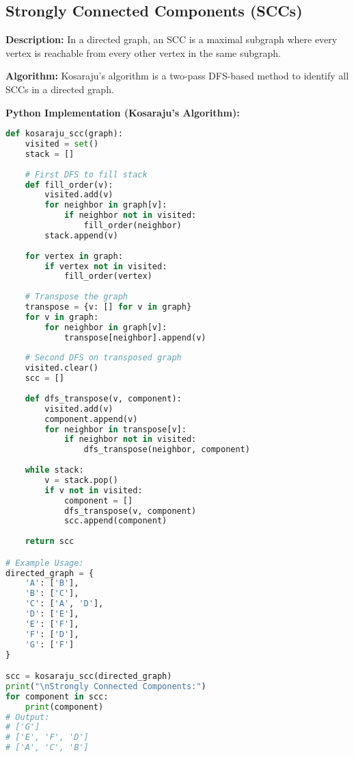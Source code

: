\subsection{Strongly Connected Components (SCCs)}

\textbf{Description:}  
In a directed graph, an SCC is a maximal subgraph where every vertex is reachable from every other vertex in the same subgraph.

\textbf{Algorithm:}  
Kosaraju's algorithm is a two-pass DFS-based method to identify all SCCs in a directed graph.

\textbf{Python Implementation (Kosaraju's Algorithm):}

\begin{lstlisting}[language=Python, xleftmargin=0.02\textwidth, xrightmargin=0.02\textwidth]
def kosaraju_scc(graph):
    visited = set()
    stack = []
    
    # First DFS to fill stack
    def fill_order(v):
        visited.add(v)
        for neighbor in graph[v]:
            if neighbor not in visited:
                fill_order(neighbor)
        stack.append(v)
    
    for vertex in graph:
        if vertex not in visited:
            fill_order(vertex)
    
    # Transpose the graph
    transpose = {v: [] for v in graph}
    for v in graph:
        for neighbor in graph[v]:
            transpose[neighbor].append(v)
    
    # Second DFS on transposed graph
    visited.clear()
    scc = []
    
    def dfs_transpose(v, component):
        visited.add(v)
        component.append(v)
        for neighbor in transpose[v]:
            if neighbor not in visited:
                dfs_transpose(neighbor, component)
    
    while stack:
        v = stack.pop()
        if v not in visited:
            component = []
            dfs_transpose(v, component)
            scc.append(component)
    
    return scc

# Example Usage:
directed_graph = {
    'A': ['B'],
    'B': ['C'],
    'C': ['A', 'D'],
    'D': ['E'],
    'E': ['F'],
    'F': ['D'],
    'G': ['F']
}

scc = kosaraju_scc(directed_graph)
print("\nStrongly Connected Components:")
for component in scc:
    print(component)
# Output:
# ['G']
# ['E', 'F', 'D']
# ['A', 'C', 'B']
\end{lstlisting}

